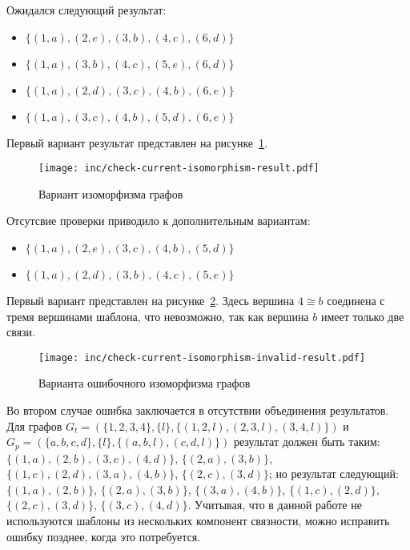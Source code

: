 Ожидался следующий результат:
\begin{itemize}
\item $\{ (1, a), (2, e), (3, b), (4, c), (6, d) \}$
\item $\{ (1, a), (3, b), (4, c), (5, e), (6, d) \}$
\item $\{ (1, a), (2, d), (3, c), (4, b), (6, e) \}$
\item $\{ (1, a), (3, c), (4, b), (5, d), (6, e) \}$
\end{itemize}
Первый вариант результат представлен на
рисунке~\ref{fig:check-current-isomorphism-result}.

\begin{figure}[!ht]
\centering
\texttt{[image: inc/check-current-isomorphism-result.pdf]}
\caption{Вариант изоморфизма графов}
\label{fig:check-current-isomorphism-result}
\end{figure}

Отсутсвие проверки приводило к дополнительным вариантам:
\begin{itemize}
\item $\{ (1, a), (2, e), (3, c), (4, b), (5, d) \}$
\item $\{ (1, a), (2, d), (3, b), (4, c), (5, e) \}$
\end{itemize}
Первый вариант представлен на
рисунке~\ref{fig:check-current-isomorphism-invalid-result}.
Здесь вершина $4 \cong b$ соединена с тремя вершинами шаблона,
что невозможно, так как вершина $b$ имеет только две связи.

\begin{figure}[!ht]
\centering
\texttt{[image: inc/check-current-isomorphism-invalid-result.pdf]}
\caption{Варианта ошибочного изоморфизма графов}
\label{fig:check-current-isomorphism-invalid-result}
\end{figure}

Во втором случае ошибка заключается в отсутствии объединения результатов.
Для графов $G_t = (\{ 1, 2, 3, 4 \}, \{ l \}, \{ (1, 2, l), (2, 3, l), (3, 4, l) \})$
и $G_p = (\{ a, b, c, d \}, \{ l \}, \{ (a, b, l), (c, d, l) \})$
результат должен быть таким:
$\{ (1, a), (2, b), (3, c), (4, d) \}$,
$\{ (2, a), (3, b) \}$,
$\{ (1, c), (2, d), (3, a), (4, b) \}$,
$\{ (2, c), (3, d) \}$;
но результат следующий:
$\{ (1, a), (2, b) \}$,
$\{ (2, a), (3, b) \}$,
$\{ (3, a), (4, b) \}$,
$\{ (1, c), (2, d) \}$,
$\{ (2, c), (3, d) \}$,
$\{ (3, c), (4, d) \}$.
Учитывая, что в данной работе не используются шаблоны из нескольких компонент
связности, можно исправить ошибку позднее, когда это потребуется.

